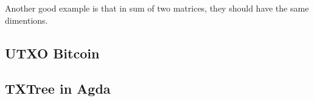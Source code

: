 \documentclass[12pt]{article}
\begin{document}

Another good example is that in sum of two matrices, they should have the same dimentions.


\subsection{UTXO Bitcoin}






\subsection{TXTree in Agda}

\end{document}
